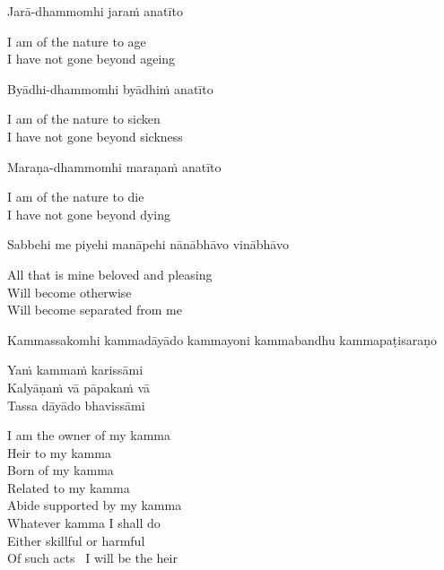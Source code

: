 Jarā-dhammomhi jaraṁ anatīto

\begin{english}
  I am of the nature to age\\
  I have not gone beyond ageing
\end{english}

Byādhi-dhammomhi byādhiṁ anatīto

\begin{english}
  I am of the nature to sicken\\
  I have not gone beyond sickness
\end{english}

Maraṇa-dhammomhi maraṇaṁ anatīto

\begin{english}
  I am of the nature to die\\
  I have not gone beyond dying
\end{english}

Sabbehi me piyehi manāpehi nānābhāvo vinābhāvo

\begin{english}
  All that is mine beloved and pleasing\\
  Will become otherwise\\
  Will become separated from me
\end{english}

\begin{pali-hang}
Kammassakomhi kammadāyādo kammayoni kammabandhu kammapaṭisaraṇo\\
\end{pali-hang}
Yaṁ kammaṁ karissāmi\\
Kalyāṇaṁ vā pāpakaṁ vā\\
Tassa dāyādo bhavissāmi

\begin{english}
  I am the owner of my kamma\\
  Heir to my kamma\\
  Born of my kamma\\
  Related to my kamma\\
  Abide supported by my kamma\\
  Whatever kamma I shall do\\
  Either skillful or harmful\\
  Of such acts \breathmark\ I will be the heir
\end{english}

